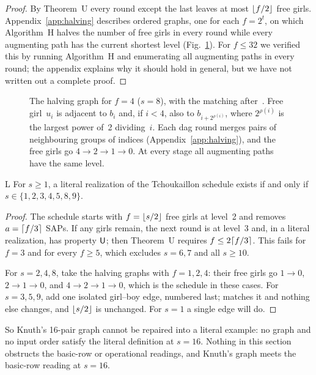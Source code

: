 \begin{proof}
By Theorem~U every round except the last leaves at most $\lfloor f/2\rfloor$ free
girls. Appendix~\ref{app:halving} describes ordered graphs, one for each
$f=2^t$, on which Algorithm~H halves the number of free girls in every
round while every augmenting path has the current shortest level
(Fig.~\ref{fig:halving}). For $f\le32$ we verified this by running
Algorithm~H and enumerating all augmenting paths in every round; the
appendix explains why it should hold in general, but we have not written
out a complete proof.
\end{proof}

\begin{figure}[ht]
\centering

\caption{The halving graph for $f=4$ ($s=8$), with the matching after~.
Free girl~$u_i$ is adjacent to $b_i$ and, if $i<4$, also to $b_{i+2^{\rho(i)}}$,
where $2^{\rho(i)}$ is the largest power of~2 dividing~$i$. Each dag round
merges pairs of neighbouring groups of indices (Appendix~\ref{app:halving}),
and the free girls go $4\to2\to1\to0$. At every stage all augmenting paths
have the same level.}
\label{fig:halving}
\end{figure}

\begin{lthm}[Corollary]{L}
For $s\ge1$, a literal realization of the Tchoukaillon schedule exists
if and only if $s\in\{1,2,3,4,5,8,9\}$.
\end{lthm}

\begin{proof}
The schedule starts with $f=\lfloor s/2\rfloor$ free girls at level~2 and removes
$a=\lceil f/3\rceil$ SAPs. If any girls remain, the next round is at level~3 and,
in a literal realization, has property $\mathsf U$; then Theorem~U requires
$f\le2\lceil f/3\rceil$. This fails for $f=3$ and for every $f\ge5$, which
excludes $s=6,7$ and all $s\ge10$.

For $s=2,4,8$, take the halving graphs with $f=1,2,4$: their free girls go
$1\to0$, $2\to1\to0$, and $4\to2\to1\to0$, which is the schedule in these
cases. For $s=3,5,9$, add one isolated girl--boy edge, numbered last;
 matches it and nothing else changes, and $\lfloor s/2\rfloor$ is unchanged.
For $s=1$ a single edge will do.
\end{proof}

So Knuth's 16-pair graph cannot be repaired into a literal example: no
graph and no input order satisfy the literal definition at $s=16$. Nothing
in this section obstructs the basic-row or operational readings, and
Knuth's graph meets the basic-row reading at $s=16$.
